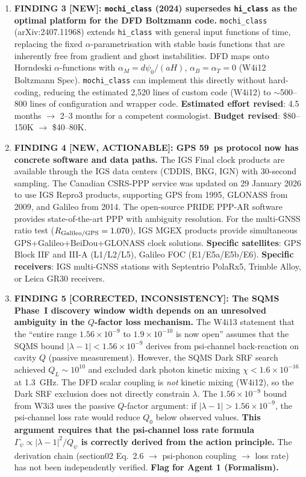 \documentclass[11pt]{article}
\newcommand{\ee}[1]{\times 10^{#1}}
\newcommand{\lbone}{|\lambda - 1|}
\newcommand{\Qpsi}{Q_\psi}
\begin{document}
\begin{tcolorbox}[colback=blue!5!white, colframe=blue!60!black,
  title=\textbf{W4i14 TOP 5 FINDINGS --- Ranked by Programme Impact}]
\begin{enumerate}
\item \textbf{FINDING 3 [NEW]: \texttt{mochi\_class} (2024) supersedes
\texttt{hi\_class} as the optimal platform for the DFD Boltzmann code.}
\texttt{mochi\_class} (arXiv:2407.11968) extends \texttt{hi\_class} with
general input functions of time, replacing the fixed $\alpha$-parametrisation
with stable basis functions that are inherently free from gradient and ghost
instabilities. DFD maps onto Horndeski $\alpha$-functions with
$\alpha_M = d\psi_0/(aH)$, $\alpha_B = \alpha_T = 0$ (W4i12 Boltzmann Spec).
\texttt{mochi\_class} can implement this directly without hard-coding,
reducing the estimated 2,520 lines of custom code (W4i12) to
$\sim$500--800 lines of configuration and wrapper code.
\textbf{Estimated effort revised}: 4.5 months $\to$ 2--3 months for a
competent cosmologist. \textbf{Budget revised}: \$80--150K $\to$ \$40--80K.

\item \textbf{FINDING 4 [NEW, ACTIONABLE]: GPS 59~ps protocol now has
concrete software and data paths.} The IGS Final clock products are
available through the IGS data centers (CDDIS, BKG, IGN) with 30-second
sampling. The Canadian CSRS-PPP service was updated on 29 January 2026
to use IGS Repro3 products, supporting GPS from 1995, GLONASS from 2009,
and Galileo from 2014. The open-source PRIDE PPP-AR software provides
state-of-the-art PPP with ambiguity resolution. For the multi-GNSS ratio
test ($R_{\rm Galileo/GPS} = 1.070$), IGS MGEX products provide
simultaneous GPS+Galileo+BeiDou+GLONASS clock solutions.
\textbf{Specific satellites}: GPS Block IIF and III-A (L1/L2/L5),
Galileo FOC (E1/E5a/E5b/E6). \textbf{Specific receivers}: IGS
multi-GNSS stations with Septentrio PolaRx5, Trimble Alloy, or
Leica GR30 receivers.

\item \textbf{FINDING 5 [CORRECTED, INCONSISTENCY]: The SQMS Phase~I
discovery window width depends on an unresolved ambiguity in the
$Q$-factor loss mechanism.} The W4i13 statement that the ``entire range
$1.56\ee{-9}$ to $1.9\ee{-10}$ is now open'' assumes that the SQMS
bound $\lbone < 1.56\ee{-9}$ derives from psi-channel back-reaction
on cavity $Q$ (passive measurement). However, the SQMS Dark SRF search
achieved $Q_L \sim 10^{10}$ and excluded dark photon kinetic mixing
$\chi < 1.6\ee{-16}$ at 1.3~GHz. The DFD scalar coupling is
\emph{not} kinetic mixing (W4i12), so the Dark SRF exclusion does
not directly constrain $\lambda$. The $1.56\ee{-9}$ bound from W3i3
uses the passive $Q$-factor argument: if $\lbone > 1.56\ee{-9}$,
the psi-channel loss rate would reduce $Q_0$ below observed values.
\textbf{This argument requires that the psi-channel loss rate formula
$\Gamma_\psi \propto |\lambda-1|^2/\Qpsi$ is correctly derived from
the action principle.} The derivation chain
(section02 Eq.~2.6 $\to$ psi-phonon coupling $\to$ loss rate) has
not been independently verified. \textbf{Flag for Agent 1 (Formalism).}

\end{enumerate}
\end{tcolorbox}
\end{document}
